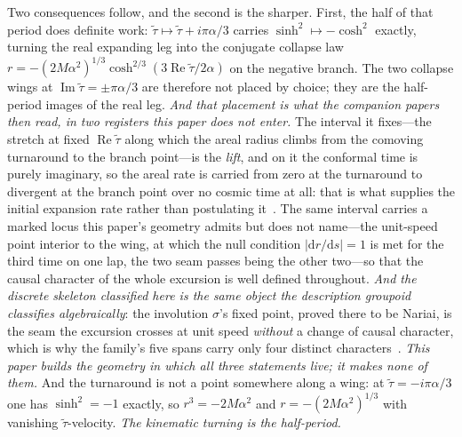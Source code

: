 \documentclass[11pt,a4paper]{article}
\theoremstyle{definition}
\newcommand{\dd}{\mathrm{d}}   %
\begin{document}
Two consequences follow, and the second is the sharper. First, the half of that period does definite work: $\tilde\tau\mapsto\tilde\tau+i\pi\alpha/3$ carries $\sinh^{2}\mapsto-\cosh^{2}$ exactly, turning the real expanding leg into the conjugate collapse law $r=-(2M\alpha^{2})^{1/3}\cosh^{2/3}(3\operatorname{Re}\tilde\tau/2\alpha)$ on the negative branch. The two collapse wings at $\operatorname{Im}\tilde\tau=\pm\pi\alpha/3$ are therefore not placed by choice; they are the half-period images of the real leg. \emph{And that placement is what the companion papers then read, in two registers this paper does not enter.} The interval it fixes---the stretch at fixed $\operatorname{Re}\tilde\tau$ along which the areal radius climbs from the comoving turnaround to the branch point---is the \emph{lift}, and on it the conformal time is purely imaginary, so the areal rate is carried from zero at the turnaround to divergent at the branch point over no cosmic time at all: that is what supplies the initial expansion rate rather than postulating it~\cite{JanzenCRframework}. The same interval carries a marked locus this paper's geometry admits but does not name---the unit-speed point interior to the wing, at which the null condition $|\dd r/\dd s|=1$ is met for the third time on one lap, the two seam passes being the other two---so that the causal character of the whole excursion is well defined throughout. \emph{And the discrete skeleton classified here is the same object the description groupoid classifies algebraically}: the involution $\sigma$'s fixed point, proved there to be Nariai, is the seam the excursion crosses at unit speed \emph{without} a change of causal character, which is why the family's five spans carry only four distinct characters~\cite{JanzenGroupoid, JanzenCRframework}. \emph{This paper builds the geometry in which all three statements live; it makes none of them.} And the turnaround is not a point somewhere along a wing: at $\tilde\tau=-i\pi\alpha/3$ one has $\sinh^{2}=-1$ exactly, so $r^{3}=-2M\alpha^{2}$ and $r=-(2M\alpha^{2})^{1/3}$ with vanishing $\tilde\tau$-velocity. \emph{The kinematic turning is the half-period.}
\end{document}
